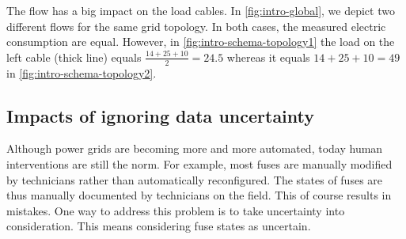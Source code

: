 The flow has a big impact on the load cables.
In \autoref{fig:intro-global}, we depict two different flows for the same grid topology.
In both cases, the measured electric consumption are equal.
However, in \autoref{fig:intro-schema-topology1} the load on the left cable (thick line) equals $\frac{14 + 25 + 10}{2} = 24.5$ whereas it equals $14+25+10=49$ in \autoref{fig:intro-schema-topology2}.


\subsection{Impacts of ignoring data uncertainty} 
\label{subsec:example-possible-consequences}
%
%

Although power grids are becoming more and more automated, today human interventions are still the norm.
For example, most fuses are manually modified by technicians rather than automatically reconfigured.
The states of fuses are thus manually documented by technicians on the field. 
This of course results in mistakes. 
One way to address this problem is to take uncertainty into consideration.
This means considering fuse states as uncertain.

